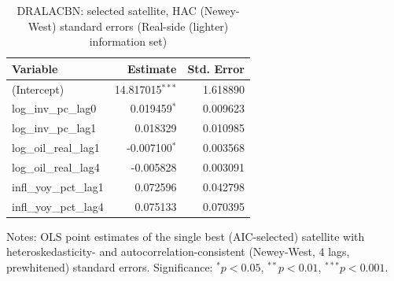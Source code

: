 \begin{table}[!htbp]
\centering
\caption{DRALACBN: selected satellite, HAC (Newey-West) standard errors (Real-side (lighter) information set)}
\label{tab:dralacbn_real_side_lighter_satellite_hac}
\begin{tabular}{lrr}
\toprule
Variable & Estimate & Std. Error \\
\midrule
(Intercept) & 14.817015$^{***}$ & 1.618890 \\
log_inv_pc_lag0 & 0.019459$^{*}$ & 0.009623 \\
log_inv_pc_lag1 & 0.018329 & 0.010985 \\
log_oil_real_lag1 & -0.007100$^{*}$ & 0.003568 \\
log_oil_real_lag4 & -0.005828 & 0.003091 \\
infl_yoy_pct_lag1 & 0.072596 & 0.042798 \\
infl_yoy_pct_lag4 & 0.075133 & 0.070395 \\
\bottomrule
\end{tabular}
\begin{tablenotes}
\small
\item Notes: OLS point estimates of the single best (AIC-selected) satellite with heteroskedasticity- and autocorrelation-consistent (Newey-West, 4 lags, prewhitened) standard errors. Significance: $^{*}p<0.05$, $^{**}p<0.01$, $^{***}p<0.001$.
\end{tablenotes}
\end{table}
